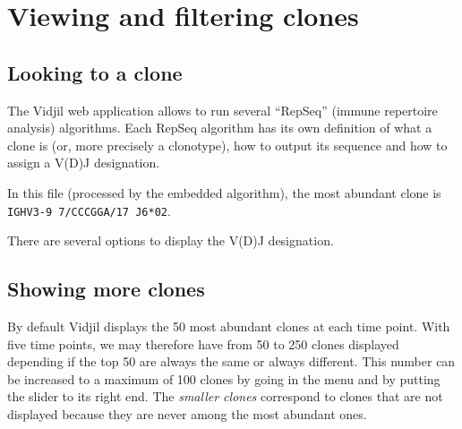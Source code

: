 \documentclass[11pt]{article}
\begin{document}
\section{Viewing and filtering clones}

\subsection{Looking to a clone}

The Vidjil web application allows to run several ``RepSeq'' (immune repertoire analysis) algorithms.
Each RepSeq algorithm has its own definition of what a clone is (or, more precisely
a clonotype), how to output its sequence and how to assign a V(D)J designation.
  
In this file (processed by the embedded algorithm), the most abundant clone
is \texttt{IGHV3-9 7/CCCGGA/17 J6*02}.


There are several options to display the V(D)J designation.

  

\subsection{Showing more clones}

By default Vidjil displays the 50 most abundant clones at each time point.
With five time points, we may therefore have from 50 to 250 clones displayed
depending if the top 50 are always the same or always different.
This number can be increased to a maximum of 100 clones by going in the  menu and by putting the
slider to its right end.
The \textit{smaller clones} correspond to clones that are not displayed
because they are never among the most abundant ones.
\end{document}
